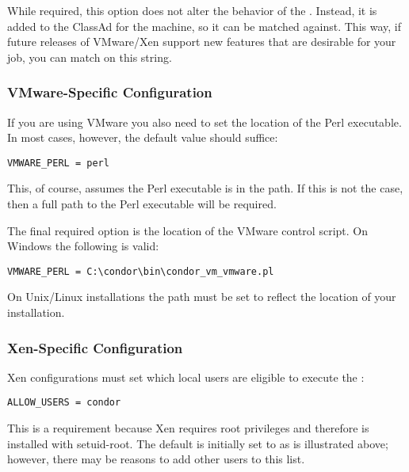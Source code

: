 While required, this option does not alter the behavior of the 
. Instead, it is added to the ClassAd for the machine, so it 
can be matched against.  This way, if future releases of VMware/Xen support
new features that are desirable for your job, you can match on this string.


\subsubsection{VMware-Specific Configuration}

If you are using VMware you also need to set the location of the Perl 
executable.  In most cases, however, the default value should suffice:

\begin{verbatim}
VMWARE_PERL = perl
\end{verbatim}

This, of course, assumes the Perl executable is in the path.  If this is not 
the case, then a full path to the Perl executable will be required.

The final required option is the location of the VMware control script. On 
Windows the following is valid:

\begin{verbatim}
VMWARE_PERL = C:\condor\bin\condor_vm_vmware.pl
\end{verbatim}

On Unix/Linux installations the path must be set to reflect the location of
your installation.

\subsubsection{Xen-Specific Configuration}

Xen configurations must set which local users 
are eligible to execute the :

\begin{verbatim}
ALLOW_USERS = condor
\end{verbatim}

This is a requirement because Xen requires root privileges and therefore
 is installed with setuid-root.  The default is initially 
set to  as is illustrated above; however, there may be reasons
to add other users to this list.

